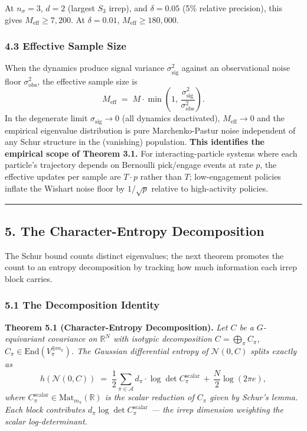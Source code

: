 \documentclass[
  11pt,
]{article}
\begin{document}
At \(n_\sigma = 3\), \(d = 2\) (largest \(S_3\) irrep), and
\(\delta = 0.05\) (5\% relative precision), this gives
\(M_\text{eff} \geq 7{,}200\). At \(\delta = 0.01\),
\(M_\text{eff} \geq 180{,}000\).

\subsubsection{4.3 Effective Sample Size}\label{effective-sample-size}

When the dynamics produce signal variance \(\sigma_\text{sig}^2\)
against an observational noise floor \(\sigma_\text{obs}^2\), the
effective sample size is
\[M_\text{eff} \;=\; M \cdot \min\!\left(1,\, \frac{\sigma_\text{sig}^2}{\sigma_\text{obs}^2}\right). \tag{4.4}\]
In the degenerate limit \(\sigma_\text{sig} \to 0\) (all dynamics
deactivated), \(M_\text{eff} \to 0\) and the empirical eigenvalue
distribution is pure Marchenko-Pastur noise independent of any Schur
structure in the (vanishing) population. \textbf{This identifies the
empirical scope of Theorem 3.1.} For interacting-particle systems where
each particle's trajectory depends on Bernoulli pick/engage events at
rate \(p\), the effective updates per sample are \(T \cdot p\) rather
than \(T\); low-engagement policies inflate the Wishart noise floor by
\(1/\sqrt{p}\) relative to high-activity policies.

\begin{center}\rule{0.5\linewidth}{0.5pt}\end{center}

\subsection{5. The Character-Entropy
Decomposition}\label{the-character-entropy-decomposition}

The Schur bound counts distinct eigenvalues; the next theorem promotes
the count to an entropy decomposition by tracking how much information
each irrep block carries.

\subsubsection{5.1 The Decomposition
Identity}\label{the-decomposition-identity}

\textbf{Theorem 5.1 (Character-Entropy Decomposition).} \emph{Let \(C\)
be a \(G\)-equivariant covariance on \(\mathbb{R}^N\) with isotypic
decomposition \(C = \bigoplus_\pi C_\pi\),
\(C_\pi \in \mathrm{End}(V_\pi^{\oplus m_\pi})\). The Gaussian
differential entropy of \(\mathcal{N}(0, C)\) splits exactly as}
\[h(\mathcal{N}(0, C)) \;=\; \frac{1}{2} \sum_{\pi \in \mathcal{A}} d_\pi \cdot \log\det C_\pi^\text{scalar} \,+\, \frac{N}{2}\log(2\pi e), \tag{5.1}\]
\emph{where \(C_\pi^\text{scalar} \in \mathrm{Mat}_{m_\pi}(\mathbb{R})\)
is the scalar reduction of \(C_\pi\) given by Schur's lemma. Each block
contributes \(d_\pi \log\det C_\pi^\text{scalar}\) --- the irrep
dimension weighting the scalar log-determinant.}
\end{document}

